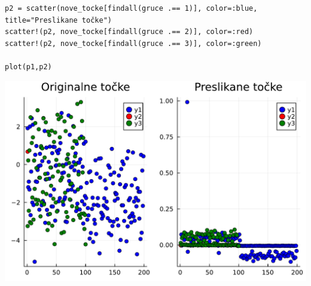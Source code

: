 \documentclass[12pt,a4paper]{article}
\begin{document}
\begin{verbatim}
p2 = scatter(nove_tocke[findall(gruce .== 1)], color=:blue, title="Preslikane točke")
scatter!(p2, nove_tocke[findall(gruce .== 2)], color=:red)
scatter!(p2, nove_tocke[findall(gruce .== 3)], color=:green)

plot(p1,p2)
\end{verbatim}
\includegraphics[width=\linewidth]{jl_Y5bBlk/demo_6_1.pdf}
\end{document}
